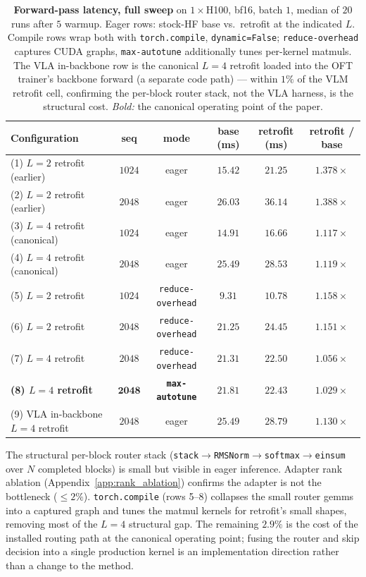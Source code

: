 \documentclass{article}
\begin{document}
\begin{table}[h]
\caption{\textbf{Forward-pass latency, full sweep} on $1{\times}$H100, bf16, batch $1$, median of $20$ runs after $5$ warmup. Eager rows: stock-HF base vs.\ retrofit at the indicated $L$. Compile rows wrap both with \texttt{torch.compile}, \texttt{dynamic=False}; \texttt{reduce-overhead} captures CUDA graphs, \texttt{max-autotune} additionally tunes per-kernel matmuls. The VLA in-backbone row is the canonical $L{=}4$ retrofit loaded into the OFT trainer's backbone forward (a separate code path) — within $1\%$ of the VLM retrofit cell, confirming the per-block router stack, not the VLA harness, is the structural cost. \emph{Bold:} the canonical operating point of the paper.}
\label{tab:retrofit_latency_full}
\centering\small
\setlength{\tabcolsep}{4pt}
\begin{tabular}{lccccc}
\toprule
Configuration & seq & mode & base (ms) & retrofit (ms) & retrofit / base \\
\midrule
(1) $L{=}2$ retrofit (earlier)       & $1024$ & eager & $15.42$ & $21.25$ & $1.378\times$ \\
(2) $L{=}2$ retrofit (earlier)       & $2048$ & eager & $26.03$ & $36.14$ & $1.388\times$ \\
(3) $L{=}4$ retrofit (canonical)     & $1024$ & eager & $14.91$ & $16.66$ & $1.117\times$ \\
(4) $L{=}4$ retrofit (canonical)     & $2048$ & eager & $25.49$ & $28.53$ & $1.119\times$ \\
\midrule
(5) $L{=}2$ retrofit                 & $1024$ & \texttt{reduce-overhead}  & $9.31$  & $10.78$ & $1.158\times$ \\
(6) $L{=}2$ retrofit                 & $2048$ & \texttt{reduce-overhead}  & $21.25$ & $24.45$ & $1.151\times$ \\
(7) $L{=}4$ retrofit                 & $2048$ & \texttt{reduce-overhead}  & $21.31$ & $22.50$ & $1.056\times$ \\
\textbf{(8) $L{=}4$ retrofit}        & $\mathbf{2048}$ & \textbf{\texttt{max-autotune}} & $\mathbf{21.81}$ & $\mathbf{22.43}$ & $\mathbf{1.029\times}$ \\
\midrule
(9) VLA in-backbone $L{=}4$ retrofit & $2048$ & eager & $25.49$ & $28.79$ & $1.130\times$ \\
\bottomrule
\end{tabular}
\end{table}

The structural per-block router stack (\texttt{stack}$\to$\texttt{RMSNorm}$\to$\texttt{softmax}$\to$\texttt{einsum} over $N$ completed blocks) is small but visible in eager inference. Adapter rank ablation (Appendix~\ref{app:rank_ablation}) confirms the adapter is not the bottleneck ($\leq 2\%$). \texttt{torch.compile} (rows 5--8) collapses the small router gemms into a captured graph and tunes the matmul kernels for retrofit's small shapes, removing most of the $L{=}4$ structural gap. The remaining $2.9\%$ is the cost of the installed routing path at the canonical operating point; fusing the router and skip decision into a single production kernel is an implementation direction rather than a change to the method.
\end{document}
